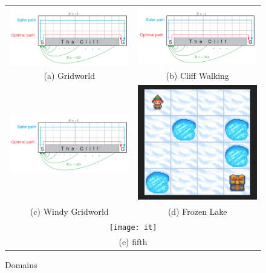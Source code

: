 \begin{figure}
\label{fig:domains}
\begin{tabular}{cc}
    \includegraphics[width=65mm]{report/assets/envs/cliff-walking.png} & \includegraphics[width=65mm]{report/assets/envs/cliff-walking.png} \\
    (a) Gridworld & (b) Cliff Walking \\[6pt]
    \includegraphics[width=65mm]{report/assets/envs/cliff-walking.png} & \includegraphics[width=65mm]{report/assets/envs/frozen-lake.png} \\[6pt]
    (c) Windy Gridworld & (d) Frozen Lake\\[6pt]
\multicolumn{2}{c}{\texttt{[image: it]} }\\
\multicolumn{2}{c}{(e) fifth}
\end{tabular}
\caption{Domains}
\end{figure}

